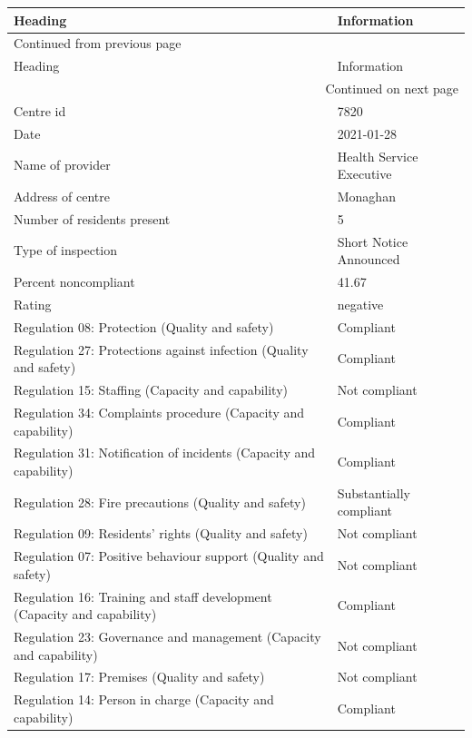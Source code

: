 \documentclass[a4paper,11pt,twoside]{article}
\begin{document}
\begin{longtable}{p{11cm}|p{5cm}}
Heading & Information\\[0pt]
\hline
\endfirsthead
\multicolumn{2}{l}{Continued from previous page} \\[0pt]
\hline

Heading & Information \\[0pt]

\hline
\endhead
\hline\multicolumn{2}{r}{Continued on next page} \\
\endfoot
\endlastfoot
\hline
Centre id & 7820\\[0pt]
Date & 2021-01-28\\[0pt]
Name of provider & Health Service Executive\\[0pt]
Address of centre & Monaghan\\[0pt]
Number of residents present & 5\\[0pt]
Type of inspection & Short Notice Announced\\[0pt]
Percent noncompliant & 41.67\\[0pt]
Rating & negative\\[0pt]
Regulation 08: Protection (Quality and safety) & Compliant\\[0pt]
Regulation 27: Protections against infection (Quality and safety) & Compliant\\[0pt]
Regulation 15: Staffing (Capacity and capability) & Not compliant\\[0pt]
Regulation 34: Complaints procedure (Capacity and capability) & Compliant\\[0pt]
Regulation 31: Notification of incidents (Capacity and capability) & Compliant\\[0pt]
Regulation 28: Fire precautions (Quality and safety) & Substantially compliant\\[0pt]
Regulation 09: Residents' rights (Quality and safety) & Not compliant\\[0pt]
Regulation 07: Positive behaviour support (Quality and safety) & Not compliant\\[0pt]
Regulation 16: Training and staff development (Capacity and capability) & Compliant\\[0pt]
Regulation 23: Governance and management (Capacity and capability) & Not compliant\\[0pt]
Regulation 17: Premises (Quality and safety) & Not compliant\\[0pt]
Regulation 14: Person in charge (Capacity and capability) & Compliant\\[0pt]
\end{longtable}
\end{document}
